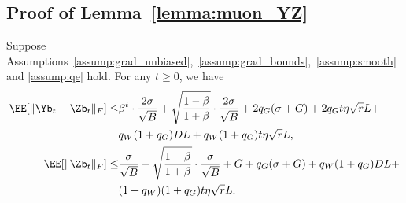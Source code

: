 \documentclass[11pt, letterpaper]{article}
\begin{document}
\subsection{Proof of Lemma~\ref{lemma:muon_YZ}}
\begin{lemma}\label{lemma:muon_YZ}
    Suppose Assumptions~\ref{assump:grad_unbiased},~\ref{assump:grad_bounds},~\ref{assump:smooth} and \ref{assump:qe} hold. For any $t\ge 0$, we have
    \begin{align*}
        \EE[\|\Yb_t - \Zb_t\|_F] \le& \beta^t\cdot\frac{2\sigma}{\sqrt{B}} + \sqrt{\frac{1-\beta}{1+\beta}}\cdot\frac{2\sigma}{\sqrt{B}} + 2q_G(\sigma + G) + 2q_G t\eta\sqrt{r}L + \\
        & q_W(1+q_G)DL + q_W(1+q_G)t\eta\sqrt{r}L, \\
        \EE[\|\Zb_t\|_F] \le& \frac{\sigma}{\sqrt{B}} + \sqrt{\frac{1-\beta}{1+\beta}}\cdot\frac{\sigma}{\sqrt{B}} + G + q_G(\sigma + G) + q_W (1+q_G)DL + \\
        & (1+q_W)(1+q_G)t\eta\sqrt{r}L.
    \end{align*}
\end{lemma}
\end{document}
